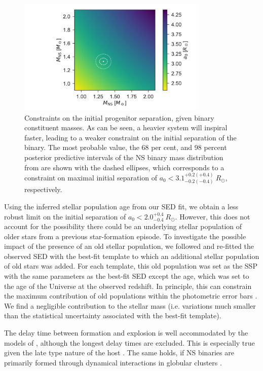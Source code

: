 \documentclass{aa}    %
\begin{document}
\begin{figure}
	\centering
	\includegraphics[width=9cm]{figures/prog_sep.pdf}
	\caption{Constraints on the initial progenitor separation, given binary constituent masses. As can be seen, a heavier system will inspiral faster, leading to a weaker constraint on the initial separation of the binary. The most probable value, the 68 per cent, and 98 percent posterior predictive intervals of the NS binary mass distribution from \citet{Kiziltan2013} are shown with the dashed ellipses, which corresponds to a constraint on maximal initial separation of $a_0 <3.1^{+0.2(+0.4)}_{-0.2(-0.4)}~R_\odot$, respectively.}
	\label{fig:prog_sep}
\end{figure}

Using the inferred stellar population age from our SED fit, we obtain a less
robust limit on the initial separation of $a_0 < 2.0^{+0.4}_{-0.4}~R_\odot$.
However, this does not account for the possibility there could be an underlying
stellar population of older stars from a previous star-formation episode. To
investigate the possible impact of the presence of an old stellar population, we
followed \citet{Papovich2001} and re-fitted the observed SED with the best-fit
template to which an additional stellar population of old stars was added. For
each template, this old population was set as the SSP with the same parameters as
the best-fit SED except the age, which was set to the age of the Universe at
the observed redshift. In principle, this can constrain the maximum contribution
of old populations within the photometric error bars \citep[see][for
details]{Papovich2001}. We find a negligible contribution to the stellar mass
(i.e. variations much smaller than the statistical uncertainty associated with
the best-fit template).

The delay time between formation and explosion is well accommodated by the
models of \citet{Belczynski2006}, although the longest delay times are excluded.
This is especially true given the late type nature of the host
\citep{OShaughnessy2008}. The same holds, if NS binaries are primarily formed
through dynamical interactions in globular clusters \citep{Lee2010, Church2011}.
\end{document}
